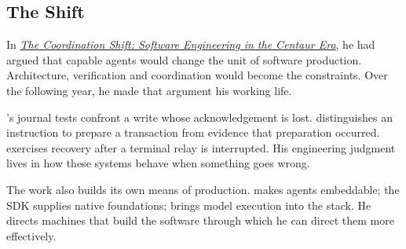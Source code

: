 \begin{EssayColumns}
{\section*{The Shift}}
\ReserveGutterQuote

\noindent In \href{https://c89.systems/10x.pdf}{\emph{The Coordination Shift: Software Engineering in the Centaur Era}}, he had argued that capable agents would change the unit of software production. Architecture, verification and coordination would become the constraints. Over the following year, he made that argument his working life.

\indent{}'s journal tests confront a write whose acknowledgement is lost.  distinguishes an instruction to prepare a transaction from evidence that preparation occurred.  exercises recovery after a terminal relay is interrupted. His engineering judgment lives in how these systems behave when something goes wrong.

The work also builds its own means of production.  makes agents embeddable; the  SDK supplies native foundations;  brings model execution into the stack. He directs machines that build the software through which he can direct them more effectively.
\end{EssayColumns}
\clearpage


